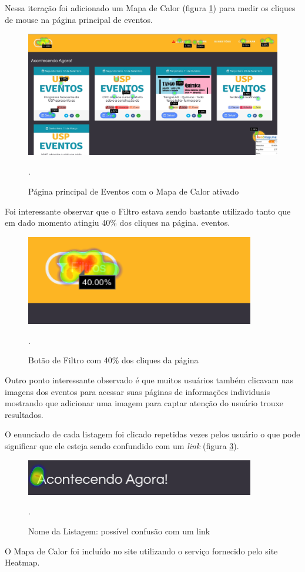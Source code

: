\par Nessa iteração foi adicionado um Mapa de Calor (figura \ref{fig:heatmap}) para medir os cliques de mouse na página principal de eventos.
\begin{figure}[htb]
\includegraphics[width=15cm]{figuras/heatmap}
\caption{\label{fig:heatmap} Página principal de Eventos com o Mapa de Calor ativado}.
\end{figure}

\par Foi interessante observar que o Filtro estava sendo bastante utilizado tanto que em dado momento atingiu 40\% dos cliques na página.
eventos.
\begin{figure}[htb]
\includegraphics[width=10cm]{figuras/heatmap_filter}
\caption{\label{fig:heatmap_filter} Botão de Filtro com 40\% dos cliques da página}.
\end{figure}

\par Outro ponto interessante observado é que muitos usuários também clicavam nas imagens dos eventos para acessar suas páginas de informações individuais mostrando que adicionar uma imagem para captar atenção do usuário trouxe resultados.

\par O enunciado de cada listagem foi clicado repetidas vezes pelos usuário o que pode significar que ele esteja sendo confundido com um \emph{link} (figura \ref{fig:heatmap_missclick}).
\begin{figure}[htb]
\includegraphics[width=10cm]{figuras/heatmap_missclick}
\caption{\label{fig:heatmap_missclick} Nome da Listagem: possível confusão com um link}.
\end{figure}
\par O Mapa de Calor foi incluído no site utilizando o serviço fornecido pelo site Heatmap.

